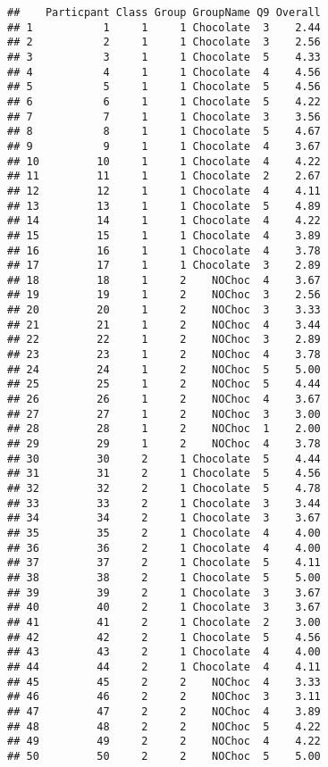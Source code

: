 \documentclass[
]{article}
\begin{document}
\begin{verbatim}
##    Particpant Class Group GroupName Q9 Overall
## 1           1     1     1 Chocolate  3    2.44
## 2           2     1     1 Chocolate  3    2.56
## 3           3     1     1 Chocolate  5    4.33
## 4           4     1     1 Chocolate  4    4.56
## 5           5     1     1 Chocolate  5    4.56
## 6           6     1     1 Chocolate  5    4.22
## 7           7     1     1 Chocolate  3    3.56
## 8           8     1     1 Chocolate  5    4.67
## 9           9     1     1 Chocolate  4    3.67
## 10         10     1     1 Chocolate  4    4.22
## 11         11     1     1 Chocolate  2    2.67
## 12         12     1     1 Chocolate  4    4.11
## 13         13     1     1 Chocolate  5    4.89
## 14         14     1     1 Chocolate  4    4.22
## 15         15     1     1 Chocolate  4    3.89
## 16         16     1     1 Chocolate  4    3.78
## 17         17     1     1 Chocolate  3    2.89
## 18         18     1     2    NOChoc  4    3.67
## 19         19     1     2    NOChoc  3    2.56
## 20         20     1     2    NOChoc  3    3.33
## 21         21     1     2    NOChoc  4    3.44
## 22         22     1     2    NOChoc  3    2.89
## 23         23     1     2    NOChoc  4    3.78
## 24         24     1     2    NOChoc  5    5.00
## 25         25     1     2    NOChoc  5    4.44
## 26         26     1     2    NOChoc  4    3.67
## 27         27     1     2    NOChoc  3    3.00
## 28         28     1     2    NOChoc  1    2.00
## 29         29     1     2    NOChoc  4    3.78
## 30         30     2     1 Chocolate  5    4.44
## 31         31     2     1 Chocolate  5    4.56
## 32         32     2     1 Chocolate  5    4.78
## 33         33     2     1 Chocolate  3    3.44
## 34         34     2     1 Chocolate  3    3.67
## 35         35     2     1 Chocolate  4    4.00
## 36         36     2     1 Chocolate  4    4.00
## 37         37     2     1 Chocolate  5    4.11
## 38         38     2     1 Chocolate  5    5.00
## 39         39     2     1 Chocolate  3    3.67
## 40         40     2     1 Chocolate  3    3.67
## 41         41     2     1 Chocolate  2    3.00
## 42         42     2     1 Chocolate  5    4.56
## 43         43     2     1 Chocolate  4    4.00
## 44         44     2     1 Chocolate  4    4.11
## 45         45     2     2    NOChoc  4    3.33
## 46         46     2     2    NOChoc  3    3.11
## 47         47     2     2    NOChoc  4    3.89
## 48         48     2     2    NOChoc  5    4.22
## 49         49     2     2    NOChoc  4    4.22
## 50         50     2     2    NOChoc  5    5.00

\end{verbatim}
\end{document}
